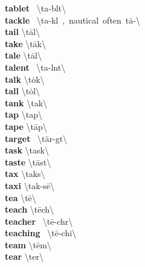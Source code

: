 \documentclass[10pt,a4paper]{article}
\begin{document}
\begin{multicols}{2}
\textbf{ tablet }\quad \ \textbackslash \textprimstress ta-bl\textschwa t\textbackslash \\
\textbf{ tackle }\quad \ \textbackslash \textprimstress ta-k\textschwa l\ ,\ nautical\ often\ \textprimstress t\={a}-\textbackslash \\
\textbf{ tail }\quad \textbackslash \textprimstress t\={a}l\textbackslash \\
\textbf{ take }\quad \textbackslash \textprimstress t\={a}k\textbackslash \\
\textbf{ tale }\quad \textbackslash \textprimstress t\={a}l\textbackslash \\
\textbf{ talent }\quad \ \textbackslash \textprimstress ta-l\textschwa nt\textbackslash \\
\textbf{ talk }\quad \textbackslash \textprimstress t\.{o}k\textbackslash \\
\textbf{ tall }\quad \textbackslash \textprimstress t\.{o}l\textbackslash \\
\textbf{ tank }\quad \textbackslash \textprimstress ta\engma k\textbackslash \\
\textbf{ tap }\quad \textbackslash \textprimstress tap\textbackslash \\
\textbf{ tape }\quad \textbackslash \textprimstress t\={a}p\textbackslash \\
\textbf{ target }\quad \ \textbackslash \textprimstress t\"{a}r-g\textschwa t\textbackslash \\
\textbf{ task }\quad \textbackslash \textprimstress task\textbackslash \\
\textbf{ taste }\quad \textbackslash \textprimstress t\={a}st\textbackslash \\
\textbf{ tax }\quad \textbackslash \textprimstress taks\textbackslash \\
\textbf{ taxi }\quad \textbackslash \textprimstress tak-s\={e}\textbackslash \\
\textbf{ tea }\quad \textbackslash \textprimstress t\={e}\textbackslash \\
\textbf{ teach }\quad \textbackslash \textprimstress t\={e}ch\textbackslash \\
\textbf{ teacher }\quad \ \textbackslash \textprimstress t\={e}-ch\textschwa r\textbackslash \\
\textbf{ teaching }\quad \ \textbackslash \textprimstress t\={e}-chi\engma \textbackslash \\
\textbf{ team }\quad \textbackslash \textprimstress t\={e}m\textbackslash \\
\textbf{ tear }\quad \textbackslash \textprimstress ter\textbackslash \\

\end{multicols}
\end{document}
